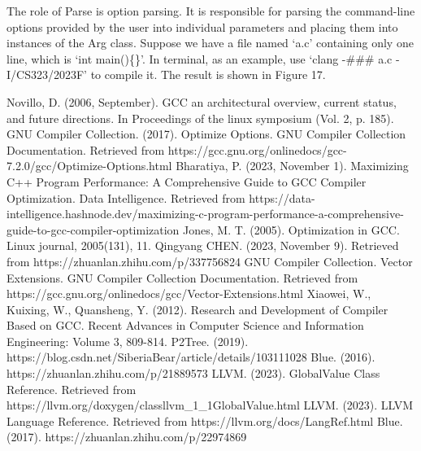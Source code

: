 \documentclass[conference]{IEEEtran}
\begin{document}
The role of Parse is option parsing. It is responsible for parsing the command-line options provided by the user into individual parameters and placing them into instances of the Arg class. Suppose we have a file named `a.c' containing only one line, which is `int main()\{\}'. In terminal, as an example, use `clang -\#\#\# a.c -I/CS323/2023F' to compile it. The result is shown in Figure 17.

\begin{thebibliography}{00}

	 Novillo, D. (2006, September). GCC an architectural overview, current status, and future directions. In Proceedings of the linux symposium (Vol. 2, p. 185).
	 GNU Compiler Collection. (2017). Optimize Options. GNU Compiler Collection Documentation. Retrieved from https://gcc.gnu.org/onlinedocs/gcc-7.2.0/gcc/Optimize-Options.html
	 Bharatiya, P. (2023, November 1). Maximizing C++ Program Performance: A Comprehensive Guide to GCC Compiler Optimization. Data Intelligence. Retrieved from https://data-intelligence.hashnode.dev/maximizing-c-program-performance-a-comprehensive-guide-to-gcc-compiler-optimization
	 Jones, M. T. (2005). Optimization in GCC. Linux journal, 2005(131), 11.
	 Qingyang CHEN. (2023, November 9). Retrieved from https://zhuanlan.zhihu.com/p/337756824
	 GNU Compiler Collection. Vector Extensions. GNU Compiler Collection Documentation. Retrieved from https://gcc.gnu.org/onlinedocs/gcc/Vector-Extensions.html
	 Xiaowei, W., Kuixing, W., Quansheng, Y. (2012). Research and Development of Compiler Based on GCC. Recent Advances in Computer Science and Information Engineering: Volume 3, 809-814.
	 P2Tree. (2019). https://blog.csdn.net/SiberiaBear/article/details/103111028
	 Blue. (2016). https://zhuanlan.zhihu.com/p/21889573
	 LLVM. (2023). GlobalValue Class Reference. Retrieved from https://llvm.org/doxygen/classllvm\_1\_1GlobalValue.html
	 LLVM. (2023). LLVM Language Reference. Retrieved from https://llvm.org/docs/LangRef.html
	 Blue. (2017). https://zhuanlan.zhihu.com/p/22974869


\end{thebibliography}

\vspace{12pt}
\end{document}
